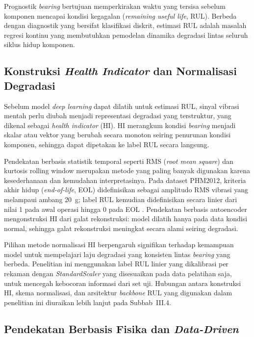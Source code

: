 Prognostik \emph{bearing} bertujuan memperkirakan waktu yang tersisa sebelum
komponen mencapai kondisi kegagalan (\emph{remaining useful life}, RUL).
Berbeda dengan diagnostik yang bersifat klasifikasi diskrit, estimasi RUL
adalah masalah regresi kontinu yang membutuhkan pemodelan dinamika degradasi
lintas seluruh siklus hidup komponen.

{\color{blue}\subsection{Konstruksi \emph{Health Indicator} dan Normalisasi Degradasi}
\label{subsec:bab2_health_indicator}}

{\color{blue}Sebelum model \emph{deep learning} dapat dilatih untuk estimasi RUL, sinyal vibrasi
mentah perlu diubah menjadi representasi degradasi yang terstruktur, yang dikenal
sebagai \emph{health indicator} (HI). HI merangkum kondisi \emph{bearing} menjadi
skalar atau vektor yang berubah secara monoton seiring penurunan kondisi komponen,
sehingga dapat dipetakan ke label RUL secara langsung.}

{\color{blue}Pendekatan berbasis statistik temporal seperti RMS (\emph{root mean square}) dan
kurtosis rolling window merupakan metode yang paling banyak digunakan karena
kesederhanaan dan kemudahan interpretasinya.
Pada dataset PHM2012, kriteria akhir hidup (\emph{end-of-life}, EOL) didefinisikan
sebagai amplitudo RMS vibrasi yang melampaui ambang 20~g; label RUL kemudian
didefinisikan secara linier dari nilai 1 pada awal operasi hingga 0 pada EOL
.
Pendekatan berbasis autoencoder 
mengonstruksi HI dari galat rekonstruksi: model dilatih hanya pada data kondisi
normal, sehingga galat rekonstruksi meningkat secara alami seiring degradasi.}

{\color{blue}Pilihan metode normalisasi HI berpengaruh signifikan terhadap kemampuan model
untuk mempelajari laju degradasi yang konsisten lintas \emph{bearing} yang berbeda.
Penelitian ini menggunakan label RUL linier yang dikalibrasi per rekaman
dengan \emph{StandardScaler} yang disesuaikan pada data pelatihan saja,
untuk mencegah kebocoran informasi dari set uji.
Hubungan antara konstruksi HI, skema normalisasi, dan arsitektur \emph{backbone}
RUL yang digunakan dalam penelitian ini diuraikan lebih lanjut pada Subbab~III.4.}

\subsection{Pendekatan Berbasis Fisika dan \emph{Data-Driven}}
\label{subsec:bab2_fisika_datadriven}

